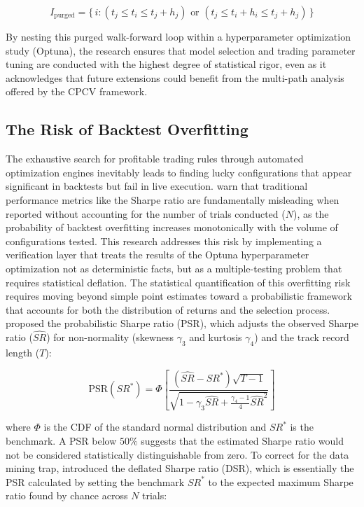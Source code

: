 \documentclass[12pt, a4paper]{article}
\begin{document}
\begin{equation}
I_{\text{purged}} = \{\, i : (t_j \leq t_i \leq t_j + h_j) \text{ or } (t_j \leq t_i + h_i \leq t_j + h_j) \,\}
\label{eq:purging}
\end{equation}

By nesting this purged walk-forward loop within a hyperparameter optimization study (Optuna), 
the research ensures that model selection and trading parameter tuning are conducted with the highest degree of statistical rigor, 
even as it acknowledges that future extensions could benefit from the multi-path analysis offered by the CPCV framework.


\subsection{The Risk of Backtest Overfitting}\label{sec:backtest_overfitting}

The exhaustive search for profitable trading rules through automated optimization engines inevitably leads to finding 
lucky configurations that appear significant in backtests but fail in live execution. 
\textcite{bailey_deflated_2014} warn that traditional performance metrics like the Sharpe ratio 
are fundamentally misleading when reported without accounting for the number of trials conducted (\(N\)), 
as the probability of backtest overfitting increases monotonically with the volume of configurations tested. 
This research addresses this risk by implementing a verification layer that treats the results of the Optuna hyperparameter optimization 
not as deterministic facts, but as a multiple-testing problem that requires statistical deflation.
The statistical quantification of this overfitting risk requires moving beyond simple point estimates toward a probabilistic framework 
that accounts for both the distribution of returns and the selection process. 
\textcite{bailey_sharpe_2012} proposed the probabilistic Sharpe ratio (PSR), which adjusts the observed Sharpe ratio (\(\widehat{SR}\)) 
for non-normality (skewness \(\gamma_3\) and kurtosis \(\gamma_4\)) and the track record length (\(T\)):

\begin{equation}
\text{PSR}(SR^*) = \Phi \left[ \frac{(\widehat{SR} - SR^*) \sqrt{T-1}}{\sqrt{1 - \gamma_3 \widehat{SR} + \frac{\gamma_4 - 1}{4} \widehat{SR}^2}} \right]
\label{eq:psr}
\end{equation}

where \(\Phi\) is the CDF of the standard normal distribution and \(SR^*\) is the benchmark. A PSR below $50\%$ suggests that the estimated Sharpe ratio would 
not be considered statistically distinguishable from zero. To correct for the data mining trap, \textcite{bailey_deflated_2014} introduced the deflated Sharpe ratio (DSR), 
which is essentially the PSR calculated by setting the benchmark \(SR^*\) to the expected maximum Sharpe ratio found by chance 
across \(N\) trials:
\end{document}
